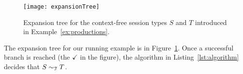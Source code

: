 \begin{figure}[t!]
\centering
	\texttt{[image: expansionTree]}
	\caption{Expansion tree for the context-free session types $S$ and $T$
	introduced in Example~\ref{ex:productions}.}
	\label{fig:expansionTree}
\end{figure}

\begin{example}
  The expansion tree for our running example is
  in Figure~\ref{fig:expansionTree}. Once a successful
  branch is reached (the $\checkmark$ in the figure), the algorithm in
  Listing~\ref{lst:algorithm} decides that $S\sim_\mathcal T T$.
\end{example}

